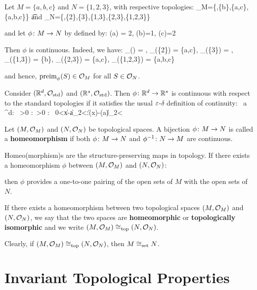 \be
Let $M = \{a,b,c\}$ and $N=\{1,2,3\}$, with respective topologies:
\bse
\cO_M=\{\vn,\{b\},\{a,c\},\{a,b,c\}\} \quad \t{and} \quad \cO_N=\{\vn,\{2\},\{3\},\{1,3\},\{2,3\},\{1,2,3\}\}
\ese

and let $\phi\colon M \to N$ by defined by:
\bse
\phi(a) = 2, \quad \phi(b)=1, \quad \phi(c)=2
\ese

Then $\phi$ is continuous. Indeed, we have:
\bse
{}_\phi(\vn) = \vn, \:\:\: _\phi(\{2\}) = \{a,c\}, \:\:\: _\phi(\{3\}) = \vn, \:\:\: _\phi(\{1,3\}) = \{b\},
\ese
\bse
{}_\phi(\{2,3\}) = \{a,c\}, \:\:\: _\phi(\{1,2,3\}) = \{a,b,c\}
\ese

and hence, $\mathrm{preim}_\phi(S) \in \mathcal{O}_M$ for all $S \in \mathcal{O}_N$.
\ee

\be
Consider $(\mathbb{R}^d,\mathcal{O}_\mathrm{std})$ and $(\mathbb{R}^s,\mathcal{O}_\mathrm{std})$. Then $\phi \colon \mathbb{R}^d\to\mathbb{R}^s$ is continuous with
respect to the standard topologies if it satisfies the usual $\varepsilon$-$\delta$ definition of continuity:
\bse
\forall \, a \in \R^d: \forall \, \ve >0 :\exists \, \delta >0 : \forall \, 0<\|x-a\|_2<\delta:\|\phi(x)-\phi(a)\|_2<\ve
\ese
\ee

\bd [Homeomorphism]
Let $(M,\mathcal{O}_M)$ and $(N,\mathcal{O}_N)$ be topological spaces. A bijection $\phi\colon M\to N$ is called a
\textbf{homeomorphism} if both $\phi\colon M\to N$ and $\phi^{-1}\colon N\to M$ are continuous.
\ed

Homeo(morphism)s are the structure-preserving maps in topology. If there exists a homeomorphism $\phi$ between $(M,
\mathcal{O}_M)$ and $(N,\mathcal{O}_N)$:

\bse
{}
\ese

then $\phi$ provides a one-to-one pairing of the open sets of $M$ with the open sets of $N$.

If there exists a homeomorphism between two topological spaces $(M,\mathcal{O}_M)$ and $(N,\mathcal{O}_N)$, we say that the two
spaces are \textbf{homeomorphic} or \textbf{topologically isomorphic} and we write $(M,\mathcal{O}_M) \cong_\mathrm{top} (N,
\mathcal{O}_N)$.
\ed

Clearly, if $(M,\mathcal{O}_M) \cong_\mathrm{top} (N,\mathcal{O}_N)$, then $M \cong_\mathrm{set} N$.

\section{Invariant Topological Properties}

